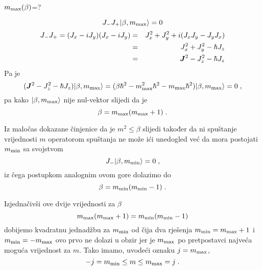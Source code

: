 $m_{\textrm{\scriptsize max}}(\beta)$=?

\begin{displaymath}
J_- J_+ | \beta, m_{\textrm{\scriptsize max}} \rangle = 0
\end{displaymath}
\begin{eqnarray*}
J_- J_+ =(J_x - i J_y)(J_x - i J_y)
   & = &J_{x}^2 + J_{y}^2 +i (J_x J_y - J_y J_x) \\
 & = & J_{x}^2 + J_{y}^2 - \hbar J_z \\
 & = & \jsq - J_{z}^2 - \hbar J_z
\end{eqnarray*}
Pa je
\begin{displaymath}
 (\jsq - J_{z}^2 - \hbar J_z)\ket{\beta, m_{\textrm{\scriptsize max}}}
 = (\beta\hbar^2 - m_{\textrm{\scriptsize max}}^2 \hbar^2 
                 - m_{\textrm{\scriptsize max}}   \hbar^2 )
\ket{\beta, m_{\textrm{\scriptsize max}}} = 0 \;,
\end{displaymath}
pa kako $| \beta, m_{\textrm{\scriptsize max}} \rangle$ nije nul-vektor
slijedi da je
\begin{displaymath}
    \beta = m_{\textrm{\scriptsize max}} ( m_{\textrm{\scriptsize max}} +1)\;.
\end{displaymath}

Iz maločas dokazane činjenice da je $m^2 \le \beta$ slijedi također
da ni spuštanje vrijednosti $m$ operatorom spuštanja ne može ići
unedogled već da mora postojati $m_{\textrm{\scriptsize min}}$
sa svojstvom
\begin{displaymath}
    J_- | \beta, m_{\textrm{\scriptsize min}} \rangle = 0 \;,
\end{displaymath}
iz čega postupkom analognim ovom gore dolazimo do
\begin{displaymath}
    \beta = m_{\textrm{\scriptsize min}} ( m_{\textrm{\scriptsize min}} -1)\;.
\end{displaymath}

Izjednačivši ove dvije vrijednosti za $\beta$ 
\begin{displaymath}
            m_{\textrm{\scriptsize max}} ( m_{\textrm{\scriptsize max}} +1)
= m_{\textrm{\scriptsize min}} ( m_{\textrm{\scriptsize min}} -1)
\end{displaymath}
dobijemo kvadratnu jednadžbu za $m_{\textrm{\scriptsize min}}$ od čija
dva rješenja $m_{\textrm{\scriptsize min}}=m_{\textrm{\scriptsize max}}+1$
i $m_{\textrm{\scriptsize min}} = - m_{\textrm{\scriptsize max}}$ ovo
prvo ne dolazi u obzir jer je $m_{\textrm{\scriptsize max}}$ po pretpostavci
najveća moguća vrijednost za $m$. Tako imamo, uvodeći oznaku
$j=m_{\textrm{\scriptsize max}}$,
\begin{displaymath}
               -j = m_{\textrm{\scriptsize min}} \le m \le 
 m_{\textrm{\scriptsize max}} = j   \;.
\end{displaymath}

